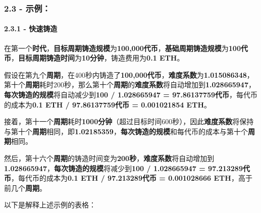 \documentclass[
]{article}
\begin{document}
\subsubsection{2.3 - 示例：}\label{ux793aux4f8b}

\paragraph{2.3.1 - 快速铸造}\label{ux5febux901fux94f8ux9020}

在第一个\textbf{时代}，\textbf{目标周期铸造规模}为\textbf{100,000代币}，\textbf{基础周期铸造规模}为\textbf{100代币}，\textbf{目标周期铸造时间}为\textbf{10分钟}，铸造费用为\textbf{0.1
ETH}。

假设在第九个\textbf{周期}，在400秒内铸造了\textbf{100,000代币}，\textbf{难度系数}为\textbf{1.015086348}，第十个\textbf{周期}耗时200秒，那么第十个\textbf{周期}的\textbf{难度系数}将自动增加到\textbf{1.028665947}，\textbf{每次铸造的规模}将自动减少到\textbf{100
/ 1.028665947 = 97.86137759代币}，每代币的成本为\textbf{0.1 ETH /
97.86137759代币 = 0.001021854 ETH}。

接着，第十一个\textbf{周期}耗时\textbf{1000分钟}（超过目标时间600秒），因此\textbf{难度系数}将保持与第十个\textbf{周期}相同，即\textbf{1.02185359}，\textbf{每次铸造的规模}和每代币的成本与第十个\textbf{周期}相同。

然后，第十六个\textbf{周期}的铸造时间变为\textbf{200秒}，\textbf{难度系数}将自动增加到\textbf{1.028665947}，\textbf{每次铸造的规模}将减少到\textbf{100
/ 1.028665947 = 97.213289代币}，每代币的成本为\textbf{0.1 ETH /
97.213289代币 = 0.001028666 ETH}，高于前几个\textbf{周期}。

以下是解释上述示例的表格：
\end{document}
